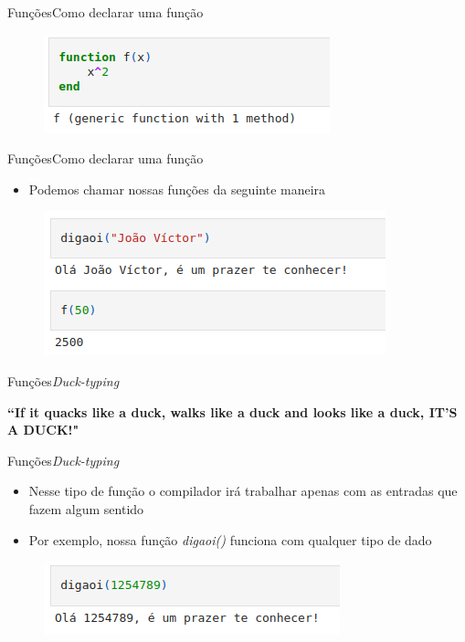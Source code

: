 \documentclass{beamer}
\begin{document}
\begin{frame}{Funções}{Como declarar uma função}
    \begin{figure}
        \centering
        \includegraphics[scale=0.4]{imagens/func02.png}
        \label{fig:my_label}
    \end{figure}   
\end{frame}

\begin{frame}{Funções}{Como declarar uma função}
    \begin{itemize}
        \item Podemos chamar nossas funções da seguinte maneira
    \end{itemize}
    \begin{figure}
        \centering
        \includegraphics[scale=0.4]{imagens/func03.png}
        \label{fig:my_label}
    \end{figure}   
\end{frame}

\begin{frame}{Funções}{\textit{Duck-typing}}
    \begin{center}
        \textbf{``If it quacks like a duck, walks like a duck and looks like a duck, IT'S A DUCK!"}
    \end{center} 
\end{frame}

\begin{frame}{Funções}{\textit{Duck-typing}}
    \begin{itemize}
        \item Nesse tipo de função o compilador irá trabalhar apenas com as entradas que fazem algum sentido
        \item Por exemplo, nossa função \textit{digaoi()} funciona com qualquer tipo de dado
    \end{itemize}
    \begin{figure}
        \centering
        \includegraphics[scale=0.4]{imagens/abs.png}
        \label{fig:my_label}
    \end{figure}     
\end{frame}
\end{document}
